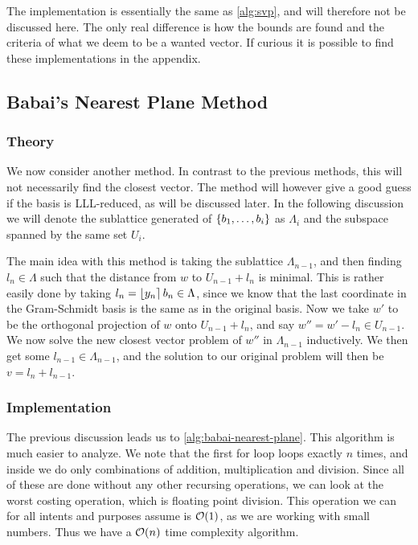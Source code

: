   The implementation is essentially the same as \cref{alg:svp}, and will therefore not be discussed here.
  The only real difference is how the bounds are found and the criteria of what we deem to be a wanted vector.
  If curious it is possible to find these implementations in the appendix.


\subsection{Babai's Nearest Plane Method}

\subsubsection{Theory}

  We now consider another method.
  In contrast to the previous methods, this will not necessarily find the closest vector.
  The method will however give a good guess if the basis is LLL-reduced, as will be discussed later.
  In the following discussion we will denote the sublattice generated of $\left\lbrace  b_1, \dots, b_i  \right\rbrace$ as $\Lambda_i$ and the subspace spanned by the same set $U_i$.

  The main idea with this method is taking the sublattice $\Lambda_{n-1}$, and then finding $l_n \in \Lambda$ such that the distance from $w$ to $U_{n-1} + l_n$ is minimal.
  This is rather easily done by taking $l_n = \left\lfloor y_n \right\rceil b_n \in \Lambda$, since we know that the last coordinate in the Gram-Schmidt basis is the same as in the original basis.
  Now we take $w'$ to be the orthogonal projection of $w$ onto $U_{n-1} + l_{n}$, and say $w'' = w' - l_n \in U_{n-1}$. 
  We now solve the new closest vector problem of $w''$ in $\Lambda_{n-1}$ inductively.
  We then get some $l_{n-1} \in \Lambda_{n-1}$, and the solution to our original problem will then be $v = l_n + l_{n-1}$.
  

\subsubsection{Implementation}

  The previous discussion leads us to \cref{alg:babai-nearest-plane}.
  This algorithm is much easier to analyze.
  We note that the first for loop loops exactly $n$ times, and inside we do only combinations of addition, multiplication and division.
  Since all of these are done without any other recursing operations, we can look at the worst costing operation, which is floating point division.
  This operation we can for all intents and purposes assume is $\mathcal{O} (1)$, as we are working with small numbers.
  Thus we have a $\mathcal{O} (n)$ time complexity algorithm.


